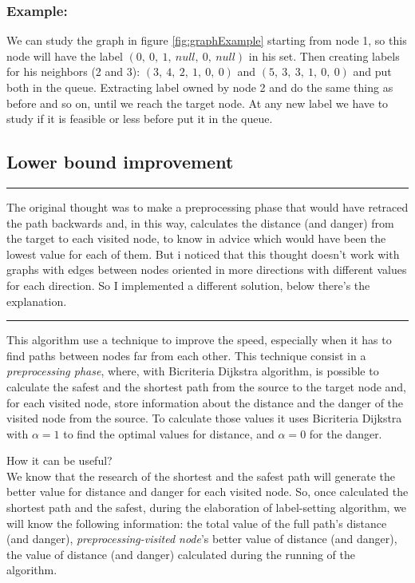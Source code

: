 \documentclass[a4paper,11pt]{report}
\begin{document}
\subsubsection*{Example:}
We can study the graph in figure \ref{fig:graphExample} starting from node 1, so this node will have the label $(0,\ 0,\ 1,\ null,\ 0,\ null)$ in his set. Then creating labels for his neighbors (2 and 3): $(3,\ 4,\ 2,\ 1,\ 0,\ 0)$ and $(5,\ 3,\ 3,\ 1,\ 0,\ 0)$ and put both in the queue. Extracting label owned by node 2 and do the same thing as before and so on, until we reach the target node. At any new label we have to study if it is feasible or less before put it in the queue.

\subsection{Lower bound improvement}
\begin{center}
	\noindent\rule{8cm}{0.1pt}
\end{center}
{\small The original thought was to make a preprocessing phase that would have retraced the path backwards and, in this way, calculates the distance (and danger) from the target to each visited node, to know in advice which would have been the lowest value for each of them. But i noticed that this thought doesn't work with graphs with edges between nodes oriented in more directions with different values for each direction. So I implemented a different solution, below there's the explanation.}
\begin{center}
	\noindent\rule{8cm}{0.1pt}
\end{center}
This algorithm use a technique to improve the speed, especially when it has to find paths between nodes far from each other. This technique consist in a \textit{preprocessing phase}, where, with Bicriteria Dijkstra algorithm, is possible to calculate the safest and the shortest path from the source to the target node and, for each visited node, store information about the distance and the danger of the visited node from the source. To calculate those values it uses Bicriteria Dijkstra with $\alpha = 1$ to find the optimal values for distance, and $\alpha = 0$ for the danger.

How it can be useful?
\\
We know that the research of the shortest and the safest path will generate the better value for distance and danger for each visited node. So, once calculated the shortest path and the safest, during the elaboration of label-setting algorithm, we will know the following information: the total value of the full path's distance (and danger), \textit{preprocessing-visited node}'s better value of distance (and danger), the value of distance (and danger) calculated during the running of the algorithm. 
\end{document}
